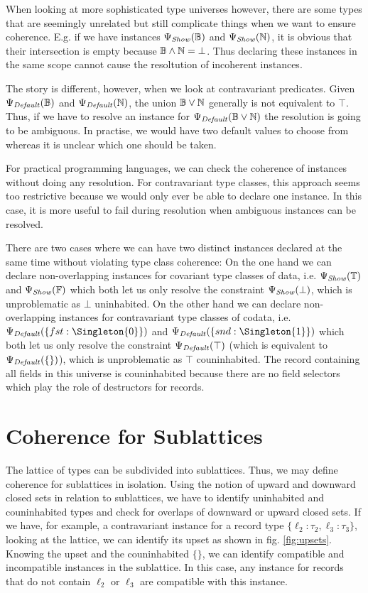 When looking at more sophisticated type universes however, there are some types that are seemingly unrelated but still complicate things when we want to ensure coherence.
E.g. if we have instances $\Psi_\mathit{Show}(\mathbb{B})$ and $\Psi_\mathit{Show}(\mathbb{N})$, it is obvious that their intersection is empty  because $\mathbb{B} \wedge \mathbb{N} = \bot$.
Thus declaring these instances in the same scope cannot cause the resoltution of incoherent instances.

The story is different, however, when we look at contravariant predicates.
Given $\Psi_\mathit{Default}(\mathbb{B})$ and $\Psi_\mathit{Default}(\mathbb{N})$, the union $\mathbb{B} \vee \mathbb{N}$ generally is not equivalent to $\top$. %
Thus, if we have to resolve an instance for $\Psi_\mathit{Default}(\mathbb{B} \vee \mathbb{N})$ the resolution is going to be ambiguous.
In practise, we would have two default values to choose from whereas it is unclear which one should be taken.

For practical programming languages, we can check the coherence of instances without doing any resolution.
For contravariant type classes, this approach seems too restrictive because we would only ever be able to declare one instance.
In this case, it is more useful to fail during resolution when ambiguous instances can be resolved.

There are two cases where we can have two distinct instances declared at the same time without violating type class coherence:
On the one hand we can declare non-overlapping instances for covariant type classes of data, i.e. $\Psi_\mathit{Show}(\mathbb{T})$ and $\Psi_\mathit{Show}(\mathbb{F})$ which both let us only resolve the constraint $\Psi_\mathit{Show}(\bot)$, which is unproblematic as $\bot$ uninhabited.
On the other hand we can declare non-overlapping instances for contravariant type classes of codata, i.e. $\Defaultable(\{fst : \Singleton{0}\})$ and $\Defaultable(\{snd : \Singleton{1}\})$ which both let us only resolve the constraint $\Psi_\mathit{Default}(\top)$ (which is equivalent to $\Psi_\mathit{Default}(\{\})$), which is unproblematic as $\top$ couninhabited.
The record containing all fields in this universe is couninhabited because there are no field selectors which play the role of destructors for records.


\section{Coherence for Sublattices}

The lattice of types can be subdivided into sublattices.
Thus, we may define coherence for sublattices in isolation.
Using the notion of upward and downward closed sets in relation to sublattices, we have to identify uninhabited and couninhabited types and check for overlaps of downward or upward closed sets.
If we have, for example, a contravariant instance for a record type $\{ \ell_2 : \tau_2, \ell_3 : \tau_3 \}$, looking at the lattice, we can identify its upset as shown in fig. \ref{fig:upsets}.
Knowing the upset and the couninhabited $\{\}$, we can identify compatible and incompatible instances in the sublattice.
In this case, any instance for records that do not contain $\ell_2$ or $\ell_3$ are compatible with this instance.

